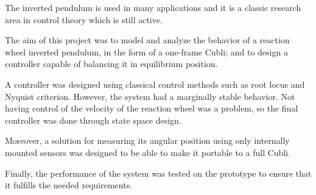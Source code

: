 The inverted pendulum is used in many applications and it is a classic research area in control theory which is still active.

The aim of this project was to model and analyze the behavior of a reaction wheel inverted pendulum, in the form of a one-frame Cubli; and to design a controller capable of balancing it in equilibrium position. 

A controller was designed using classical control methods such as root locus and Nyquist criterion. However, the system had a marginally stable behavior. Not having control of the velocity of the reaction wheel was a problem, so the final controller was done through state space design.

Moreover, a solution for measuring its angular position using only internally mounted sensors was designed to be able to make it portable to a full Cubli. 

Finally, the performance of the system was tested on the prototype to ensure that it fulfills the needed requirements.
